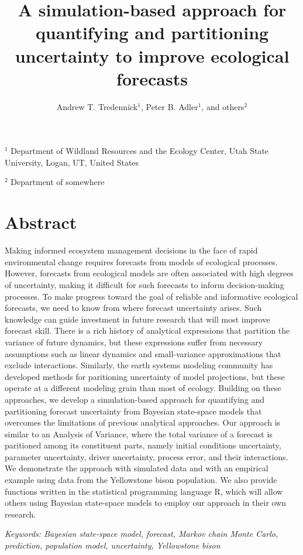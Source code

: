 \documentclass[12pt,]{article}
\title{A simulation-based approach for quantifying and partitioning uncertainty
to improve ecological forecasts}
\author{Andrew T. Tredennick\(^{1}\), Peter B. Adler\(^1\), and others\(^{2}\)}
\date{}
\begin{document}
\maketitle

\setlength{\abovedisplayskip}{0pt} \raggedright

\(^1\) Department of Wildland Resources and the Ecology Center, Utah
State University, Logan, UT, United States

\(^2\) Department of somewhere

\section{Abstract}\label{abstract}

Making informed ecosystem management decisions in the face of rapid
environmental change requires forecasts from models of ecological
processes. However, forecasts from ecological models are often
associated with high degrees of uncertainty, making it difficult for
such forecasts to inform decision-making processes. To make progress
toward the goal of reliable and informative ecological forecasts, we
need to know from where forecast uncertainty arises. Such knowledge can
guide investment in future research that will most improve forecast
skill. There is a rich history of analytical expressions that partition
the variance of future dynamics, but these expressions suffer from
necessary assumptions such as linear dynamics and small-variance
approximations that exclude interactions. Similarly, the earth systems
modeling community has developed methods for paritioning uncertainty of
model projections, but these operate at a different modeling grain than
most of ecology. Building on these approaches, we develop a
simulation-based approach for quantifying and partitioning forecast
uncertainty from Bayesian state-space models that overcomes the
limitations of previous analytical approaches. Our approach is similar
to an Analysis of Variance, where the total variance of a forecast is
paritioned among its constituent parts, namely initial conditions
uncertainty, parameter uncertainty, driver uncertainty, process error,
and their interactions. We demonstrate the approach with simulated data
and with an empirical example using data from the Yellowstone bison
population. We also provide functions written in the statistical
programming language R, which will allow others using Bayesian
state-space models to employ our approach in their own research.

\emph{Keywords: Bayesian state-space model, forecast, Markov chain Monte
Carlo, prediction, population model, uncertainty, Yellowstone bison}
\end{document}
